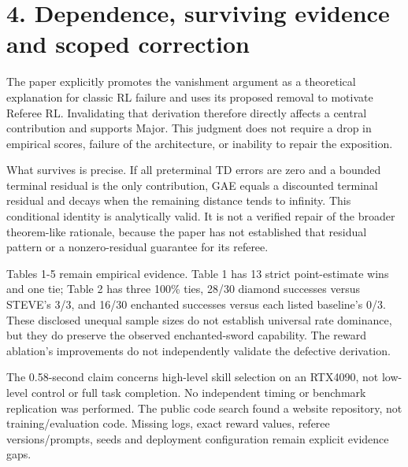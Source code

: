 \documentclass[10pt]{article}
\begin{document}
\section*{4. Dependence, surviving evidence and scoped correction}
The paper explicitly promotes the vanishment argument as a theoretical explanation for classic RL failure and uses its proposed removal to motivate Referee RL. Invalidating that derivation therefore directly affects a central contribution and supports Major. This judgment does not require a drop in empirical scores, failure of the architecture, or inability to repair the exposition.\par
What survives is precise. If all preterminal TD errors are zero and a bounded terminal residual is the only contribution, GAE equals a discounted terminal residual and decays when the remaining distance tends to infinity. This conditional identity is analytically valid. It is not a verified repair of the broader theorem-like rationale, because the paper has not established that residual pattern or a nonzero-residual guarantee for its referee.\par
Tables 1-5 remain empirical evidence. Table 1 has 13 strict point-estimate wins and one tie; Table 2 has three 100\% ties, 28/30 diamond successes versus STEVE’s 3/3, and 16/30 enchanted successes versus each listed baseline’s 0/3. These disclosed unequal sample sizes do not establish universal rate dominance, but they do preserve the observed enchanted-sword capability. The reward ablation’s improvements do not independently validate the defective derivation.\par
The 0.58-second claim concerns high-level skill selection on an RTX4090, not low-level control or full task completion. No independent timing or benchmark replication was performed. The public code search found a website repository, not training/evaluation code. Missing logs, exact reward values, referee versions/prompts, seeds and deployment configuration remain explicit evidence gaps.\par
\end{document}
